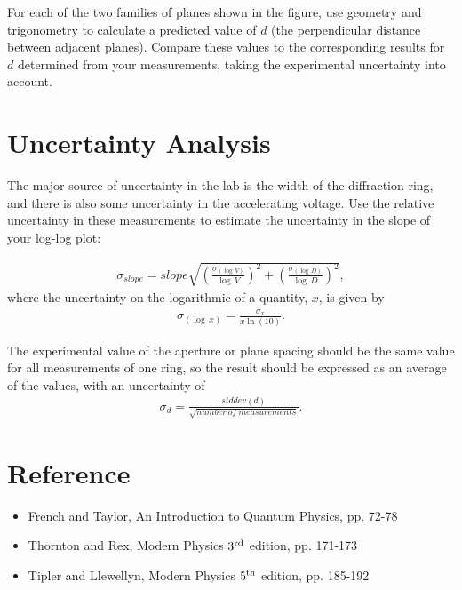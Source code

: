 \documentclass{tufte-handout}
\begin{document}
\begin{enumerate}
For each of the two families of planes shown in the figure, use geometry
and trigonometry to calculate a predicted value of $d$ (the perpendicular
distance between adjacent planes).  Compare these values to the
corresponding results for $d$ determined from your measurements, taking
the experimental uncertainty into account.

\end{enumerate}

\section{Uncertainty Analysis}

The major source of uncertainty in the lab is the width of the diffraction ring,
and there is also some uncertainty in the accelerating voltage.  Use the
relative uncertainty in these measurements to estimate the uncertainty in the
slope of your log-log plot:

\begin{align*}
\sigma_{slope} = slope \sqrt{\left(\frac{\sigma_{(\log\,V)}}{\log\,V}\right)^2 +
  \left(\frac{\sigma_{(\log\,D)}}{\log\,D}\right)^2},
\end{align*}
\noindent where the uncertainty on the logarithmic of a quantity, $x$, is given
by 
\begin{align*}
  \sigma_{(\log\,x)} = \frac{\sigma_x}{x\ln(10)}.
\end{align*}

The experimental value of the aperture or plane spacing should be the same value
for all measurements of one ring, so the result should be expressed as an
average of the values, with an uncertainty of
\begin{align*}
\sigma_d = \frac{stddev(d)}{\sqrt{number\ of\ measurements}}.
\end{align*}


\section{Reference}
\begin{itemize}
\item French and Taylor, An Introduction to Quantum Physics, pp. 72-78
\item Thornton and Rex, Modern Physics $3^{\rm rd}$ edition, pp. 171-173
\item Tipler and Llewellyn, Modern Physics $5^{\rm th}$ edition, pp. 185-192

\end{itemize}
\end{document}
